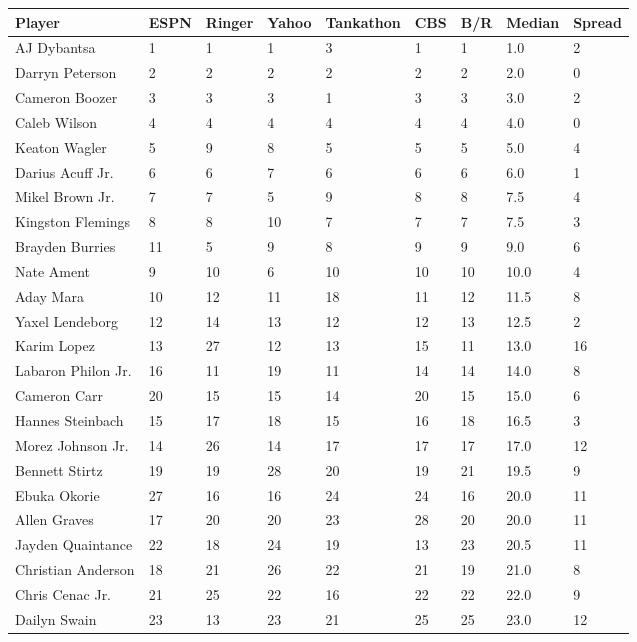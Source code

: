 \documentclass[
  10pt,
]{article}
\newcounter{none} %
\begin{document}
{\def\LTcaptype{none} %
\begin{longtable}[]{@{}lllllllll@{}}
\toprule\noalign{}
Player & ESPN & Ringer & Yahoo & Tankathon & CBS & B/R & Median & Spread \\
\midrule\noalign{}
\endhead
\bottomrule\noalign{}
\endlastfoot
AJ Dybantsa & 1 & 1 & 1 & 3 & 1 & 1 & 1.0 & 2 \\
Darryn Peterson & 2 & 2 & 2 & 2 & 2 & 2 & 2.0 & 0 \\
Cameron Boozer & 3 & 3 & 3 & 1 & 3 & 3 & 3.0 & 2 \\
Caleb Wilson & 4 & 4 & 4 & 4 & 4 & 4 & 4.0 & 0 \\
Keaton Wagler & 5 & 9 & 8 & 5 & 5 & 5 & 5.0 & 4 \\
Darius Acuff Jr. & 6 & 6 & 7 & 6 & 6 & 6 & 6.0 & 1 \\
Mikel Brown Jr. & 7 & 7 & 5 & 9 & 8 & 8 & 7.5 & 4 \\
Kingston Flemings & 8 & 8 & 10 & 7 & 7 & 7 & 7.5 & 3 \\
Brayden Burries & 11 & 5 & 9 & 8 & 9 & 9 & 9.0 & 6 \\
Nate Ament & 9 & 10 & 6 & 10 & 10 & 10 & 10.0 & 4 \\
Aday Mara & 10 & 12 & 11 & 18 & 11 & 12 & 11.5 & 8 \\
Yaxel Lendeborg & 12 & 14 & 13 & 12 & 12 & 13 & 12.5 & 2 \\
Karim Lopez & 13 & 27 & 12 & 13 & 15 & 11 & 13.0 & 16 \\
Labaron Philon Jr. & 16 & 11 & 19 & 11 & 14 & 14 & 14.0 & 8 \\
Cameron Carr & 20 & 15 & 15 & 14 & 20 & 15 & 15.0 & 6 \\
Hannes Steinbach & 15 & 17 & 18 & 15 & 16 & 18 & 16.5 & 3 \\
Morez Johnson Jr. & 14 & 26 & 14 & 17 & 17 & 17 & 17.0 & 12 \\
Bennett Stirtz & 19 & 19 & 28 & 20 & 19 & 21 & 19.5 & 9 \\
Ebuka Okorie & 27 & 16 & 16 & 24 & 24 & 16 & 20.0 & 11 \\
Allen Graves & 17 & 20 & 20 & 23 & 28 & 20 & 20.0 & 11 \\
Jayden Quaintance & 22 & 18 & 24 & 19 & 13 & 23 & 20.5 & 11 \\
Christian Anderson & 18 & 21 & 26 & 22 & 21 & 19 & 21.0 & 8 \\
Chris Cenac Jr. & 21 & 25 & 22 & 16 & 22 & 22 & 22.0 & 9 \\
Dailyn Swain & 23 & 13 & 23 & 21 & 25 & 25 & 23.0 & 12 \\

\end{longtable}}
\end{document}
